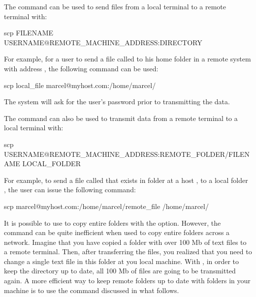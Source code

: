 The  command can be used to send files from a local terminal to a remote terminal with:
\begin{command_line}[make]
  scp FILENAME USERNAME@REMOTE_MACHINE_ADDRESS:DIRECTORY
\end{command_line}
  
For example, for a user  to send a file called  to his home folder in a remote system with address , the following command can be used:
\begin{command_line}[make]
scp local_file marcel@myhost.com:/home/marcel/
\end{command_line}

The system will ask for the user's password prior to transmitting the data.

The  command can also be used to transmit data from a remote terminal to a local terminal with:

\begin{command_line}[make]
  scp USERNAME@REMOTE_MACHINE_ADDRESS:REMOTE_FOLDER/FILENAME LOCAL_FOLDER
\end{command_line}

For example, to send a file called  that exists in folder  at a host , to a local folder , the user  can issue the following command:
  
\begin{command_line}[make]
scp marcel@myhost.com:/home/marcel/remote_file /home/marcel/
\end{command_line}

It is possible to use  to copy entire folders with the  option. However, the  command can be quite inefficient when used to copy entire folders across a network. Imagine that you have copied a folder with over 100 Mb of text files to a remote terminal. Then, after transferring the files, you realized that you need to change a single text file in this folder at you local machine. With , in order to keep the directory up to date, all 100 Mb of files are going to be transmitted again. A more efficient way to keep remote folders up to date with folders in your machine is to use the  command discussed in what follows.

